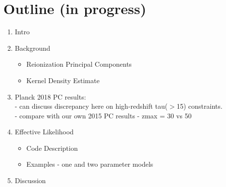 \documentclass[prd,twocolumn,amsmath,amssymb,floatfix,superscriptaddress,nofootinbib]{revtex4-1}
\begin{document}


\appendix

\section{Outline (in progress)}

\begin{enumerate}
	\item{Intro}
	\item{Background}
		\begin{itemize}
			\item{Reionization Principal Components}	
			\item{Kernel Density Estimate}
		\end{itemize}
	\item{Planck 2018 PC results:\\
		- can discuss discrepancy here on high-redshift tau($>$15) constraints.\\
		- compare with our own 2015 PC results
		- zmax = 30 vs 50}
	\item{Effective Likelihood}
		\begin{itemize}
			\item{Code Description}
			\item{Examples - one and two parameter models}
		\end{itemize}
	\item{Discussion}
		
\end{enumerate}
\end{document}
